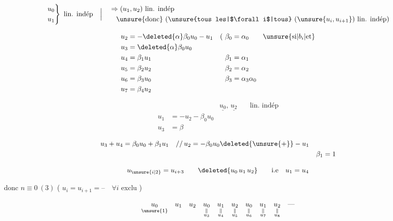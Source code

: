 \margin{$=$}

\[
\left.\begin{aligned}u_0\\u_1\end{aligned}\right\}\ \text{lin. indép}
\quad\Big|\quad
\begin{aligned}
&\Rightarrow (u_1,u_2)\ \text{lin. indép}\\
&\quad\text{\unsure{donc} (\unsure{tous les|$\forall i$|tous} $(\unsure{u_i,u_{i+1}})$ lin. indép)}
\end{aligned}
\]

\[
\begin{aligned}
u_2&=-\deleted{\alpha}\beta_0u_0-u_1 &(\ \beta_0&=\alpha_0\qquad\unsure{\text{si}|b_i|\text{et}}\\
u_3&=\deleted{\alpha}\beta_0u_0\\
u_4&=\beta_1u_1 &\beta_{1}&=\alpha_1\\
u_5&=\beta_2u_2 &\beta_2&=\alpha_2\\
u_6&=\beta_3u_0 &\beta_3&=\alpha_3\alpha_0\\
u_7&=\beta_4u_2
\end{aligned}
\]

\[
\boxed{\begin{aligned}
&&\underline{u_0},\,\underline{u_2}\quad &\text{lin. indép}\\
u_1&=-u_2-\beta_0u_0\\
u_3&=\beta
\end{aligned}}
\]

\[
\begin{aligned}
u_3+u_4&=\beta_0u_0+\beta_1u_1\quad //\, u_2=-\beta_0u_0\deleted{\unsure{+}}-u_1\\
&&\beta_1=1
\end{aligned}
\]

\[
u_{\unsure{i|2}}=u_{i+3}\qquad\deleted{u_0\,u_1\,u_2}\qquad\text{i.e}\quad u_1=u_4
\]

donc $n\equiv0\ (3)$ ( $u_i=u_{i+1}=\text{--}\quad\forall i$ exclu \unsure{---})

\[
\underset{\unsure{1}}{u_0}\quad u_1\quad u_2\quad
\underset{\substack{\Vert\\u_3}}{u_0}\quad\underset{\substack{\Vert\\u_4}}{u_1}\quad
\underset{\substack{\Vert\\u_5}}{u_2}\quad\underset{\substack{\Vert\\u_6}}{u_0}\quad
\underset{\substack{\Vert\\u_7}}{u_1}\quad\underset{\substack{\Vert\\u_8}}{u_2}\quad\text{---}
\]

